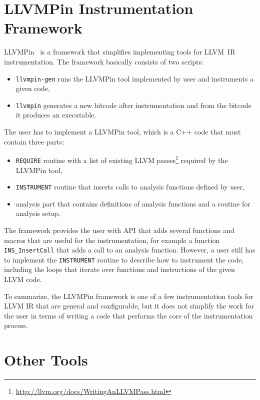 \section{LLVMPin Instrumentation Framework}

LLVMPin~\cite{llvmpin} is a framework that simplifies implementing tools for
LLVM~IR instrumentation. The framework basically consists of two scripts:

\begin{itemize}
    \item \texttt{llvmpin-gen} runs the LLVMPin tool implemented by
          user and instruments a given code,
    \item \texttt{llvmpin} generates a new
	  bitcode after instrumentation and from the bitcode it produces an
          executable.
\end{itemize}

The user has to implement a LLVMPin tool, which is a C++ code that must contain three
parts:

\begin{itemize}
    \item \texttt{REQUIRE} routine with a list of existing LLVM
          passes\footnote{\url{http://llvm.org/docs/WritingAnLLVMPass.html}} required by
          the LLVMPin tool,
    \item \texttt{INSTRUMENT} routine that inserts calls to analysis functions
          defined by user,
    \item analysis part that contains definitions of analysis functions and a
          routine for analysis setup.
\end{itemize}

The framework provides the user with API that adds several functions and macros
that are useful for the instrumentation, for example a function
\texttt{INS\_InsertCall} that adds a call to an analysis function. However, a
user still has to implement the \texttt{INSTRUMENT} routine to describe how to
instrument the code, including the loops that iterate over functions and
instructions of the given LLVM code.

To summarize, the LLVMPin framework is one of a few instrumentation tools for
LLVM IR that are general and configurable, but it does not simplify the work
for the user in terms of writing a code that performs the core of the
instrumentation process.

\section{Other Tools}


